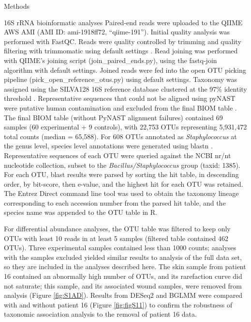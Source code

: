\documentclass[oneside,12pt,final]{sty/ucthesis-CA2012}
\begin{document}
\begin{mainmatter}
\begin{section}{Methods}
\begin{subsection}{16S rRNA bioinformatic analyses}
Paired-end reads were uploaded to the QIIME AWS AMI (AMI ID: ami-1918ff72, “qiime-191”)\cite{RN81}. Initial quality analysis was performed with FastQC. Reads were quality controlled by trimming and quality filtering with trimmomatic using default settings \cite{RN82}. Read joining was performed with QIIME’s joining script (join\_paired\_ends.py), using the fastq-join algorithm with default settings. Joined reads were fed into the open OTU picking pipeline (pick\_open\_reference\_otus.py) using default settings. Taxonomy was assigned using the SILVA128 16S reference database clustered at the 97\% identity threshold \cite{RN35}. Representative sequences that could not be aligned using pyNAST were putative human contamination \cite{RN43} and excluded from the final BIOM table \cite{RN44}. The final BIOM table (without PyNAST alignment failures) contained 69 samples (60 experimental + 9 controls), with 22,753 OTUs representing 5,931,472 total counts (median = 65,588). For 608 OTUs annotated as \textit{Staphylococcus} at the genus level, species level annotations were generated using blastn \cite{RN51}. Representative sequences of each OTU were queried against the NCBI nr/nt nucleotide collection, subset to the \textit{Bacillus/Staphylococcus} group (taxid: 1385). For each OTU, blast results were parsed by sorting the hit table, in descending order, by bit-score, then e-value, and the highest hit for each OTU was retained. The Entrez Direct command line tool was used to obtain the taxonomy lineage corresponding to each accession number from the parsed hit table, and the species name was appended to the OTU table in R. 

For differential abundance analyses, the OTU table was filtered to keep only OTUs with least 10 reads in at least 5 samples (filtered table contained 462 OTUs). Three experimental samples contained less than 1000 counts; analyses with the samples excluded yielded similar results to analysis of the full data set, so they are included in the analyses described here. The skin sample from patient 16 contained an abnormally high number of OTUs, and its rarefaction curve did not saturate; this sample, and its associated wound samples, were removed from analysis (Figure \ref{fig:S1AD}). Results from DESeq2 and BGLMM were compared with and without patient 16 (Figure \ref{fig:figS11}) to confirm the robustness of taxonomic association analysis to the removal of patient 16 data. 
\end{subsection}


\end{section}
\end{mainmatter}
\end{document}
